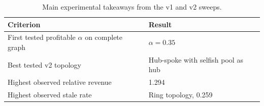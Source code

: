\begin{table}[htbp]
\centering
\caption{Main experimental takeaways from the v1 and v2 sweeps.}
\label{tab:main-takeaways}
\begin{tabular}{ll}
\toprule
Criterion & Result \\
\midrule
First tested profitable $\alpha$ on complete graph & $\alpha = 0.35$ \\
Best tested v2 topology & Hub-spoke with selfish pool as hub \\
Highest observed relative revenue & 1.294 \\
Highest observed stale rate & Ring topology, 0.259 \\
\bottomrule
\end{tabular}
\end{table}
